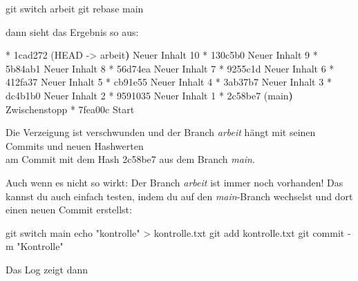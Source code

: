 \documentclass[
  letterpaper,
  DIV=11]{scrreprt}
\newenvironment{Shaded}{\begin{snugshade}}{\end{snugshade}}
\newcommand{\AttributeTok}[1]{\textcolor[rgb]{0.40,0.45,0.13}{#1}}
\newcommand{\BuiltInTok}[1]{\textcolor[rgb]{0.00,0.23,0.31}{#1}}
\newcommand{\ErrorTok}[1]{\textcolor[rgb]{0.68,0.00,0.00}{#1}}
\newcommand{\ExtensionTok}[1]{\textcolor[rgb]{0.00,0.23,0.31}{#1}}
\newcommand{\FunctionTok}[1]{\textcolor[rgb]{0.28,0.35,0.67}{#1}}
\newcommand{\KeywordTok}[1]{\textcolor[rgb]{0.00,0.23,0.31}{\textbf{#1}}}
\newcommand{\NormalTok}[1]{\textcolor[rgb]{0.00,0.23,0.31}{#1}}
\newcommand{\OperatorTok}[1]{\textcolor[rgb]{0.37,0.37,0.37}{#1}}
\newcommand{\StringTok}[1]{\textcolor[rgb]{0.13,0.47,0.30}{#1}}
\newcommand{\branch}[1]{\textit{#1}\xspace}
\begin{document}
\begin{Shaded}
\begin{Highlighting}[]
\FunctionTok{git}\NormalTok{ switch arbeit }
\FunctionTok{git}\NormalTok{ rebase main }
\end{Highlighting}
\end{Shaded}

dann sieht das Ergebnis so aus:

\begin{Shaded}
\begin{Highlighting}[]
\ExtensionTok{*}\NormalTok{ 1cad272 }\ErrorTok{(}\ExtensionTok{HEAD} \AttributeTok{{-}}\OperatorTok{\textgreater{}}\NormalTok{ arbeit}\KeywordTok{)} \ExtensionTok{Neuer}\NormalTok{ Inhalt 10}
\ExtensionTok{*}\NormalTok{ 130c5b0 Neuer Inhalt 9}
\ExtensionTok{*}\NormalTok{ 5b84ab1 Neuer Inhalt 8}
\ExtensionTok{*}\NormalTok{ 56d74ea Neuer Inhalt 7}
\ExtensionTok{*}\NormalTok{ 9255c1d Neuer Inhalt 6}
\ExtensionTok{*}\NormalTok{ 412fa37 Neuer Inhalt 5}
\ExtensionTok{*}\NormalTok{ cb91e55 Neuer Inhalt 4}
\ExtensionTok{*}\NormalTok{ 3ab37b7 Neuer Inhalt 3}
\ExtensionTok{*}\NormalTok{ dc4b1b0 Neuer Inhalt 2}
\ExtensionTok{*}\NormalTok{ 9591035 Neuer Inhalt 1}
\ExtensionTok{*}\NormalTok{ 2c58be7 }\ErrorTok{(}\ExtensionTok{main}\KeywordTok{)} \ExtensionTok{Zwischenstopp}
\ExtensionTok{*}\NormalTok{ 7fea00c Start}
\end{Highlighting}
\end{Shaded}

Die Verzeigung ist verschwunden und der Branch \branch{arbeit} hängt mit
seinen Commits und neuen Hashwerten\\
am Commit mit dem Hash 2c58be7 aus dem Branch \branch{main}.

Auch wenn es nicht so wirkt: Der Branch \branch{arbeit} ist immer noch
vorhanden! Das kannst du auch einfach testen, indem du auf den
\branch{main}-Branch wechselst und dort einen neuen Commit erstellst:

\begin{Shaded}
\begin{Highlighting}[]
\FunctionTok{git}\NormalTok{ switch main }
\BuiltInTok{echo} \StringTok{"kontrolle"} \OperatorTok{\textgreater{}}\NormalTok{ kontrolle.txt }
\FunctionTok{git}\NormalTok{ add kontrolle.txt }
\FunctionTok{git}\NormalTok{ commit }\AttributeTok{{-}m} \StringTok{"Kontrolle"}
\end{Highlighting}
\end{Shaded}

Das Log zeigt dann
\end{document}
